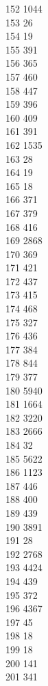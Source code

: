 { 152	1044 \\
 153	26 \\
 154	19 \\
 155	391 \\
 156	365 \\
 157	460 \\
 158	447 \\
 159	396 \\
 160	409 \\
 161	391 \\
 162	1535 \\
 163	28 \\
 164	19 \\
 165	18 \\
 166	371 \\
 167	379 \\
 168	416 \\
 169	2868 \\
 170	369 \\
 171	421 \\
 172	437 \\
 173	415 \\
 174	468 \\
 175	327 \\
 176	436 \\
 177	384 \\
 178	844 \\
 179	377 \\
 180	5940 \\
 181	1664 \\
 182	3220 \\
 183	2666 \\
 184	32 \\
 185	5622 \\
 186	1123 \\
 187	446 \\
 188	400 \\
 189	439 \\
 190	3891 \\
 191	28 \\
 192	2768 \\
 193	4424 \\
 194	439 \\
 195	372 \\
 196	4367 \\
 197	45 \\
 198	18 \\
 199	18 \\
 200	141 \\
 201	341 \\
}
